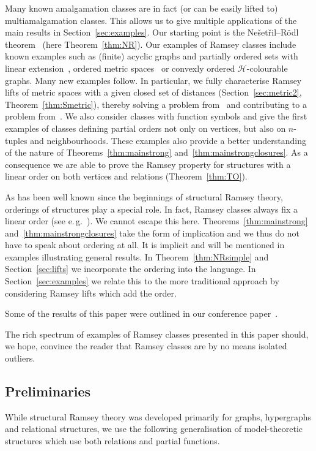 \documentclass{elsarticle}
\newcommand{\eg}{e.\,g.}
\theoremstyle{plain}
\theoremstyle{definition}
\theoremstyle{remark}
\begin{document}
Many known amalgamation classes are in fact (or can be easily lifted to) multiamalgamation classes. This allows us to give  multiple applications of the main results in Section~\ref{sec:examples}. Our starting point is the Ne\v set\v ril--R\" odl theorem~\cite{Nevsetvril1977} (here Theorem~\ref{thm:NR}). Our examples of Ramsey classes include known examples such as (finite) acyclic graphs and partially ordered sets with linear extension~\cite{Nevsetvril1984}, ordered metric spaces~\cite{Nevsetvril2007} or convexly ordered $\mathcal H$-colourable graphs. Many new examples follow. In particular, we fully characterise Ramsey lifts of metric spaces with a given closed set of distances (Section~\ref{sec:metric2}, Theorem~\ref{thm:Smetric}), thereby solving a problem from~\cite{The2010} and contributing to a problem from~\cite{Kechris2005}. We also consider classes with function symbols and give the first examples of classes defining partial orders not only on vertices, but also on $n$-tuples and neighbourhoods.
These examples also provide a better understanding of the nature of Theorems~\ref{thm:mainstrong} and~\ref{thm:mainstrongclosures}.
As a consequence we are able to prove the Ramsey property for structures with a linear order on both vertices and relations (Theorem~\ref{thm:TO}).


\medskip

As has been well known since the beginnings of structural Ramsey theory, 
orderings of structures play a special role. In fact, Ramsey
classes always fix a linear order (see \eg{}\ \cite{Kechris2005}). 
We cannot
escape this here.  Theorems~\ref{thm:mainstrong} and~\ref{thm:mainstrongclosures} take the form of 
implication and we thus do not have to speak about ordering at all. It is implicit
and will be mentioned in examples illustrating general results.  In 
Theorem~\ref{thm:NRsimple} and
Section~\ref{sec:lifts} we incorporate the ordering into the language. In
Section~\ref{sec:examples} we relate this to the more traditional approach by considering Ramsey lifts
which add the order.

Some of the results of this paper were outlined in our conference paper~\cite{hubivcka2015ramsey}.

The rich spectrum of examples of Ramsey classes presented in this paper should, we hope, convince the reader that Ramsey classes are by no means isolated outliers.

\subsection{Preliminaries}
\label{sec:perliminaries}
While structural Ramsey theory was developed primarily for graphs, hypergraphs and relational structures,
we use the following generalisation of model-theoretic structures which use both relations and partial functions. 
\end{document}
